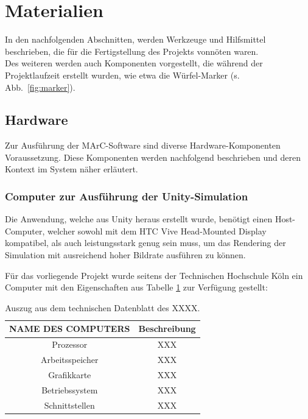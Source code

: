 \section{Materialien}\label{sec:Materialien}
In den nachfolgenden Abschnitten, werden Werkzeuge und Hilfsmittel beschrieben, die für die Fertigstellung des Projekts vonnöten waren.\\ Des weiteren werden auch Komponenten vorgestellt, die während der Projektlaufzeit erstellt wurden, wie etwa die Würfel-Marker (s. Abb.~\ref{fig:marker}).

\subsection{Hardware}
Zur Ausführung der MArC-Software sind diverse Hardware-Komponenten Voraussetzung. Diese Komponenten werden nachfolgend beschrieben und deren Kontext im System näher erläutert.
\subsubsection{Computer zur Ausführung der Unity-Simulation}\label{sec:UnityComp}
Die Anwendung, welche aus Unity \cite{website:Unity} heraus erstellt wurde, benötigt einen Host-Computer, welcher sowohl mit dem HTC Vive Head-Mounted Display kompatibel, als auch leistungsstark genug sein muss, um das Rendering der Simulation mit ausreichend hoher Bildrate ausführen zu können.

Für das vorliegende Projekt wurde seitens der Technischen Hochschule Köln ein Computer mit den  Eigenschaften aus Tabelle \ref{tab:UnityCompParam} zur Verfügung gestellt:


\begin{table}
	\centering
	\begin{tabular}{|c|c|}
		\hline
		\Absatzbox{}
		\textbf{NAME DES COMPUTERS}& \textbf{Beschreibung} \\
		\hline
		Prozessor & XXX \\
		\hline
		Arbeitsspeicher & XXX \\
		\hline 
		Grafikkarte & XXX\\
		\hline
		Betriebssystem &XXX \\
		\hline
		Schnittstellen & XXX \\
		\hline
	\end{tabular}
	\caption{Auszug aus dem technischen Datenblatt des XXXX.}
	\label{tab:UnityCompParam}
\end{table}


